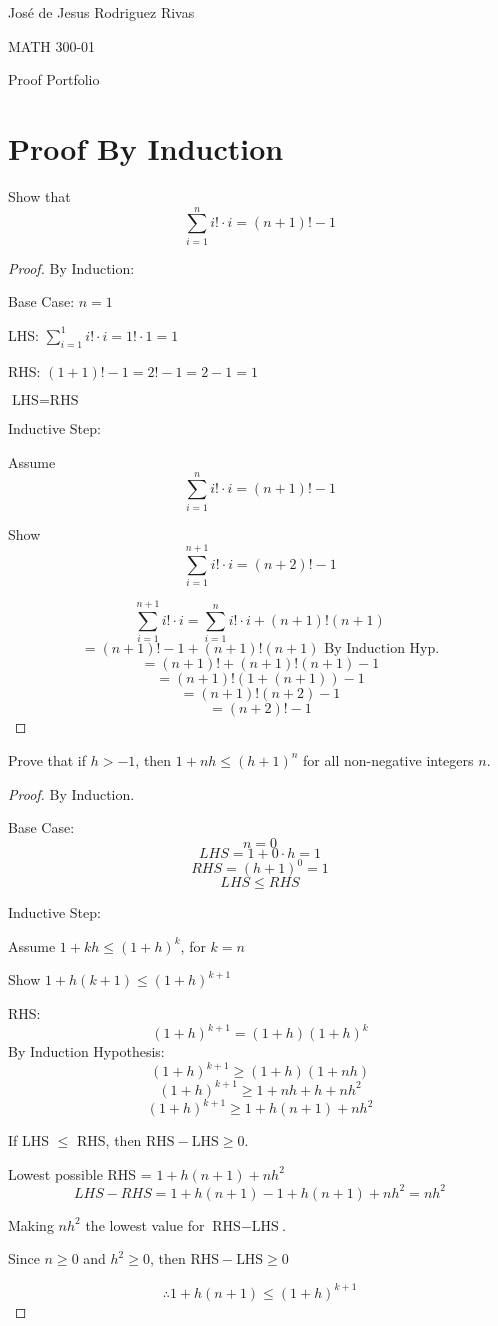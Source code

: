 \documentclass[12pt]{article}
\begin{document}
José de Jesus Rodriguez Rivas

MATH 300-01

\newcommand{\contradiction}{\Rightarrow\Leftarrow}

\begin{center}
Proof Portfolio
\end{center}
\section{Proof By Induction}

Show that
$$\sum_{i = 1}^{n} i! \cdot i = (n + 1)! - 1$$

\begin{proof}
By Induction:

Base Case: $n = 1$

LHS: $\sum_{i=1}^{1} i! \cdot i = 1! \cdot 1 = 1$

RHS: $(1 +1)! - 1 = 2! - 1 = 2 - 1 = 1$

$\text{LHS} = \text{RHS}$

Inductive Step: 

Assume 
$$\sum_{i = 1}^{n} i! \cdot i = (n + 1)! - 1$$

Show 
$$\sum_{i = 1}^{n+1} i! \cdot i = (n + 2)! - 1$$

$$\sum_{i = 1}^{n+1} i! \cdot i = \sum_{i = 1}^{n} i! \cdot i + (n + 1)! (n+1)$$
$$= (n+1)!-1 + (n + 1)!(n+1)\text{ By Induction Hyp.}$$
$$= (n+1)! + (n+1)!(n+1)-1$$
$$= (n+1)!(1 + (n+1)) - 1$$
$$= (n+1)!(n+2)-1$$
$$= (n+2)! - 1$$
\end{proof}

\newpage
\begin{flushleft}
Prove that if $h > -1$, then $1 + nh \leq (h+1)^n$ for all non-negative integers $n$.
\end{flushleft}
\begin{proof}
By Induction.

Base Case:
$$n = 0$$
$$LHS = 1 + 0\cdot h = 1$$
$$RHS = (h+1)^0 = 1$$
$$LHS \leq RHS$$

Inductive Step:

Assume $1 + kh \leq (1+h)^k$, for $k = n$

Show $1 + h(k + 1) \leq (1+h)^{k+1}$

RHS:
$$(1+h)^{k+1} = (1+h)(1+h)^k$$
By Induction Hypothesis:
$$(1+h)^{k+1} \geq (1+h)(1+nh)$$
$$(1+h)^{k+1} \geq 1+nh+h+nh^2$$
$$(1+h)^{k+1} \geq 1+h(n+1)+nh^2$$

If LHS $\leq$ RHS, then $\text{RHS} - \text{LHS} \geq 0$. 

Lowest possible RHS = $1+h(n+1)+nh^2$
$$LHS - RHS = 1 + h(n + 1) - 1+h(n+1)+nh^2 = nh^2$$

Making $nh^2$ the lowest value for $\text{RHS} - \text{LHS}$.

Since $n \geq 0$ and $h^2 \geq 0$, then  $\text{RHS} - \text{LHS} \geq 0$


$$\therefore 1 + h(n + 1) \leq (1+h)^{k+1}$$

\end{proof}
\end{document}
